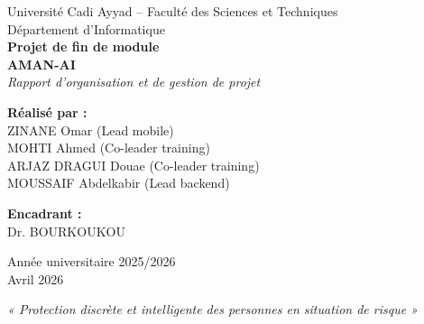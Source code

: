 \documentclass[11pt,a4paper]{article}
\begin{document}
\begin{titlepage}
    \centering
    \vspace*{1cm}
    
    {\Large Université Cadi Ayyad -- Faculté des Sciences et Techniques\\[0.2cm]
    Département d’Informatique}\\[1cm]
    
    {\Large\textbf{Projet de fin de module}}\\[0.3cm]
    {\Huge\bfseries\sffamily\textcolor{primary}{AMAN-AI}}\\[0.3cm]
    {\Large\textit{Rapport d'organisation et de gestion de projet}}\\[0.5cm]
    
    \vspace{0.5cm}
    
    \begin{minipage}{0.7\textwidth}
        \centering
        \textbf{Réalisé par :}\\
        ZINANE Omar (Lead mobile)\\
        MOHTI Ahmed (Co-leader training)\\
        ARJAZ DRAGUI Douae (Co-leader training)\\
        MOUSSAIF Abdelkabir (Lead backend)\\
    \end{minipage}
    
    \vspace{0.5cm}
    
    \begin{minipage}{0.7\textwidth}
        \centering
        \textbf{Encadrant :}\\
        Dr. BOURKOUKOU\\
    \end{minipage}
    
    \vspace{1cm}
    
    {\large Année universitaire 2025/2026}\\[0.3cm]
    {\large Avril 2026}\\[0.5cm]
    
    \begin{tcolorbox}[colback=graylight, colframe=primary, width=0.8\textwidth, arc=4pt, boxrule=0.5pt]
        \centering
        \textit{« Protection discrète et intelligente des personnes en situation de risque »}
    \end{tcolorbox}
    
    \vfill
\end{titlepage}
\end{document}
